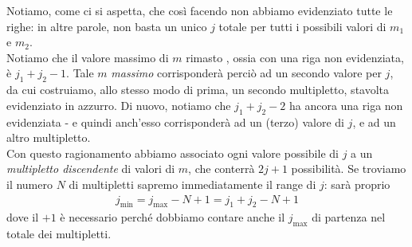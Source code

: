 \documentclass[../../FisicaTeorica.tex]{subfiles}
\begin{document}
Notiamo, come ci si aspetta, che così facendo non abbiamo evidenziato tutte le righe: in altre parole, non basta un unico $j$ totale per  tutti i possibili valori di $m_1$ e $m_2$.\\
Notiamo che il valore massimo di $m$ rimasto , ossia con una riga non evidenziata, è $j_1+j_2-1$. Tale $m$ \textit{massimo} corrisponderà perciò ad un secondo valore per $j$, da cui costruiamo, allo stesso modo di prima, un secondo multipletto, stavolta evidenziato in azzurro. Di nuovo, notiamo che $j_1 + j_2 -2$ ha ancora una riga non evidenziata - e quindi anch'esso corrisponderà ad un (terzo) valore di $j$, e ad un altro multipletto.\\

Con questo ragionamento abbiamo associato ogni valore possibile di $j$ a un \textit{multipletto discendente} di valori di $m$, che conterrà $2j+1$ possibilità. Se troviamo il numero $N$ di multipletti sapremo immediatamente il range di $j$: sarà proprio 
\begin{align*}
j_{\min} = j_{\max} - N + 1= j_1 + j_2 -N +1
\end{align*}
 dove il $+1$ è necessario perché dobbiamo contare anche il $j_{\max}$ di partenza nel totale dei multipletti.\\
\end{document}
